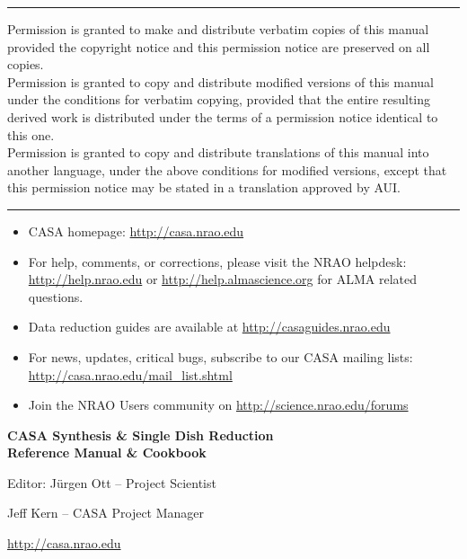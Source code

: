 \pagestyle{empty}

\small
\hrule
\vspace{2mm}
\noindent Permission is granted to make and distribute verbatim
copies of this manual provided the copyright notice and this
permission notice are preserved on all copies. \\
\noindent Permission is granted to copy and distribute modified versions of this
manual under the conditions for verbatim copying, provided that the
entire resulting derived work is distributed under the terms of a
permission notice identical to this one. \\
\noindent Permission is granted to copy and distribute translations of
this manual into another language, under the above conditions for
modified versions, except that this permission notice may be stated in
a translation approved by AUI.\\
\hrule
\vspace{2mm}
\normalsize
\vfill
\begin{itemize}
\item CASA homepage: \url{http://casa.nrao.edu}
\item For help, comments, or corrections, please visit the NRAO
helpdesk: \url{http://help.nrao.edu} or
\url{http://help.almascience.org} for ALMA related questions.
\item Data reduction guides are available at \url{http://casaguides.nrao.edu}
\item For news, updates, critical bugs, subscribe to our CASA mailing lists: \url{http://casa.nrao.edu/mail_list.shtml} 
\item Join the NRAO Users community on \url{http://science.nrao.edu/forums}
\end{itemize}
\normalsize

\pagebreak


\begin{center}
\LARGE
{\bf CASA Synthesis \& Single Dish Reduction\\ Reference Manual \& Cookbook} 

\vspace{3cm}



\Large
{Editor: J\"urgen Ott -- Project Scientist}

\vspace{1cm}

{Jeff Kern -- CASA Project Manager}

\normalsize
\vspace{3cm}
{\Large \url{http://casa.nrao.edu}}\\
\vspace{2cm}
\end{center}
\vfill

